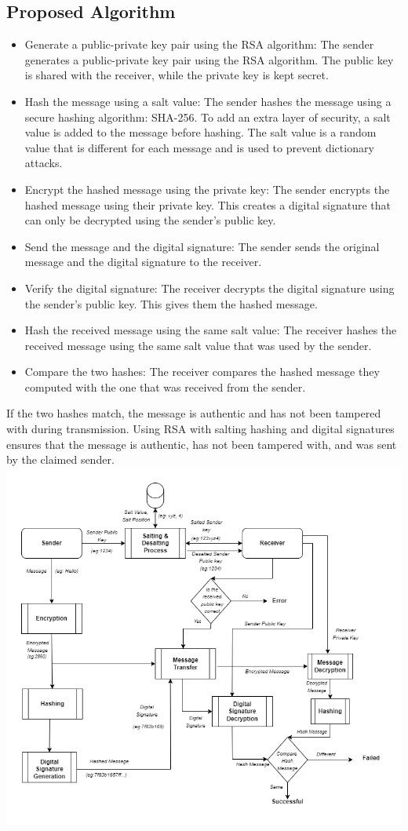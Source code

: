 \subsection*{Proposed Algorithm}
\begin{itemize}
	\item Generate a public-private key pair using the RSA algorithm: The sender generates a public-private key pair using the RSA algorithm.
	      The public key is shared with the receiver, while the private key is kept secret.
	\item Hash the message using a salt value: The sender hashes the message using a secure hashing algorithm: SHA-256.
	      To add an extra layer of security, a salt value is added to the message before hashing.
	      The salt value is a random value that is different for each message and is used to prevent dictionary attacks.
	\item Encrypt the hashed message using the private key: The sender encrypts the hashed message using their private key.
	      This creates a digital signature that can only be decrypted using the sender's public key.
	\item Send the message and the digital signature: The sender sends the original message and the digital signature to the receiver.
	\item Verify the digital signature: The receiver decrypts the digital signature using the sender's public key. This gives them the hashed message.
	\item Hash the received message using the same salt value: The receiver hashes the received message using the same salt value that was used by the sender.
	\item Compare the two hashes: The receiver compares the hashed message they computed with the one that was received from the sender.
\end{itemize}
If the two hashes match, the message is authentic and has not been tampered with during transmission.
Using RSA with salting hashing and digital signatures ensures that the message is authentic, has not been tampered with,
and was sent by the claimed sender.
\includegraphics[width=160mm]{images/proposedalgo2.png}

